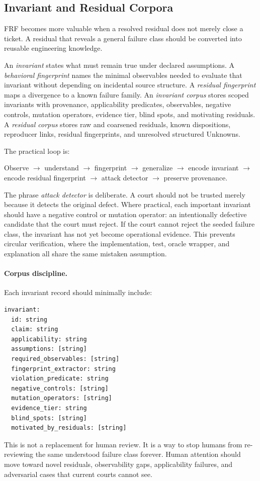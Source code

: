 \documentclass[11pt,a4paper]{article}
\newcommand{\frf}{\textsc{FRF}}
\begin{document}
\subsection{Invariant and Residual Corpora}

\frf{} becomes more valuable when a resolved residual does not merely close a ticket. A residual that reveals a general failure class should be converted into reusable engineering knowledge.

An \emph{invariant} states what must remain true under declared assumptions. A \emph{behavioral fingerprint} names the minimal observables needed to evaluate that invariant without depending on incidental source structure. A \emph{residual fingerprint} maps a divergence to a known failure family. An \emph{invariant corpus} stores scoped invariants with provenance, applicability predicates, observables, negative controls, mutation operators, evidence tier, blind spots, and motivating residuals. A \emph{residual corpus} stores raw and coarsened residuals, known dispositions, reproducer links, residual fingerprints, and unresolved structured Unknowns.

The practical loop is:
\begin{center}
\small
Observe \(\rightarrow\) understand \(\rightarrow\) fingerprint \(\rightarrow\) generalize \(\rightarrow\) encode invariant
\(\rightarrow\) encode residual fingerprint \(\rightarrow\) attack detector \(\rightarrow\) preserve provenance.
\end{center}

The phrase \emph{attack detector} is deliberate. A court should not be trusted merely because it detects the original defect. Where practical, each important invariant should have a negative control or mutation operator: an intentionally defective candidate that the court must reject. If the court cannot reject the seeded failure class, the invariant has not yet become operational evidence. This prevents circular verification, where the implementation, test, oracle wrapper, and explanation all share the same mistaken assumption.

\paragraph{Corpus discipline.}
Each invariant record should minimally include:
\begin{verbatim}
invariant:
  id: string
  claim: string
  applicability: string
  assumptions: [string]
  required_observables: [string]
  fingerprint_extractor: string
  violation_predicate: string
  negative_controls: [string]
  mutation_operators: [string]
  evidence_tier: string
  blind_spots: [string]
  motivated_by_residuals: [string]
\end{verbatim}
This is not a replacement for human review. It is a way to stop humans from re-reviewing the same understood failure class forever. Human attention should move toward novel residuals, observability gaps, applicability failures, and adversarial cases that current courts cannot see.
\end{document}

